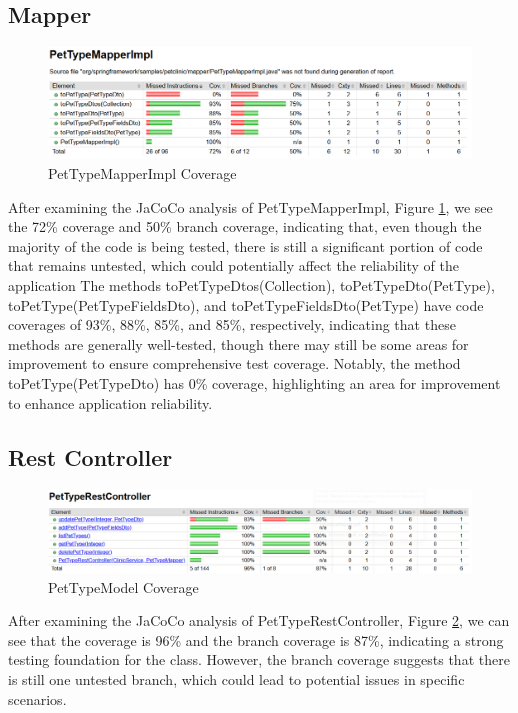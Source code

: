 \documentclass[a4paper,11pt,openright,BCOR=15mm]{scrbook}
\begin{document}
		
		
		\newpage
		\subsection{Mapper}
		\begin{figure}[H]
			\centering
			\includegraphics[width=\textwidth]{figs/Funcional Correctness/PetTypeMapperImpl.png}
			\caption{PetTypeMapperImpl Coverage}
			\label{fig:PetTypeMapperImpl}
		\end{figure}
		
		After examining the JaCoCo analysis of PetTypeMapperImpl, Figure \ref{fig:PetTypeMapperImpl}, we see the 72\% coverage and 50\% branch coverage, indicating that, even though the majority of the code is being tested, there is still a significant portion of code that remains untested, which could potentially affect the reliability of the application
		The methods toPetTypeDtos(Collection), toPetTypeDto(PetType), toPetType(PetTypeFieldsDto), and toPetTypeFieldsDto(PetType) have code coverages of 93\%, 88\%, 85\%, and 85\%, respectively, indicating that these methods are generally well-tested, though there may still be some areas for improvement to ensure comprehensive test coverage.
		Notably, the method toPetType(PetTypeDto) has 0\% coverage, highlighting an area for improvement to enhance application reliability.
		
		
		
		\subsection{Rest Controller}
		\begin{figure}[H]
			\centering
			\includegraphics[width=\textwidth]{figs/Funcional Correctness/PetTypeRestController.png}
			\caption{PetTypeModel Coverage}
			\label{fig:PetTypeRestController}
		\end{figure}
		After examining the JaCoCo analysis of PetTypeRestController, Figure \ref{fig:PetTypeRestController}, we can see that the coverage is 96\% and the branch coverage is 87\%, indicating a strong testing foundation for the class. However, the branch coverage suggests that there is still one untested branch, which could lead to potential issues in specific scenarios.
		
\end{document}
